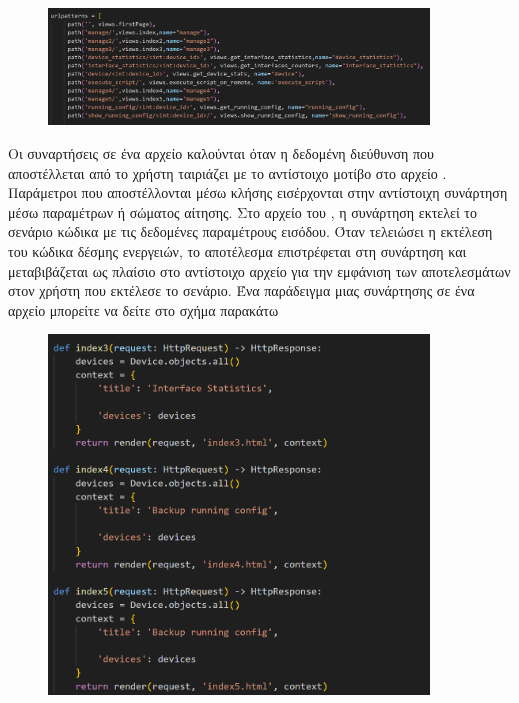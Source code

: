 \begin{figure}[htb]
	\centering
	\includegraphics[width=0.9\textwidth]{graphics/urlpy.png}
	\caption{ }
\end{figure}

Οι συναρτήσεις σε ένα αρχείο  καλούνται όταν η δεδομένη διεύθυνση  που αποστέλλεται από το
χρήστη ταιριάζει με το αντίστοιχο μοτίβο  στο αρχείο . Παράμετροι που αποστέλλονται μέσω κλήσης
 εισέρχονται στην αντίστοιχη συνάρτηση μέσω παραμέτρων ή σώματος αίτησης. Στο αρχείο  του , η συνάρτηση εκτελεί το σενάριο
κώδικα με τις δεδομένες παραμέτρους εισόδου. Όταν τελειώσει η εκτέλεση του κώδικα δέσμης ενεργειών,
το αποτέλεσμα επιστρέφεται στη συνάρτηση  και μεταβιβάζεται ως πλαίσιο στο αντίστοιχο αρχείο  για την εμφάνιση των αποτελεσμάτων στον χρήστη που εκτέλεσε το σενάριο.
Ένα παράδειγμα μιας συνάρτησης σε ένα αρχείο  μπορείτε να δείτε στο σχήμα παρακάτω

\begin{figure}[htb]
	\centering
	\includegraphics[width=0.9\textwidth]{graphics/viewspy.png}
	\caption{ }
\end{figure}

